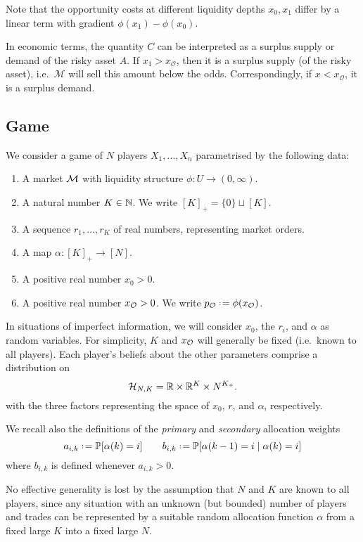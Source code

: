 Note that the opportunity costs at different liquidity depths \(x_0,x_1\) differ by a linear term with gradient \(\phi(x_1)-\phi(x_0)\).


\begin{remark} 
  
  In economic terms, the quantity \(C\) can be interpreted as a surplus supply or demand of the risky asset \(A\). 
  If \(x_1>x_\mathcal{O}\), then it is a surplus supply (of the risky asset), i.e.~\(\mathcal{M}\) will sell this amount below the odds.
  Correspondingly, if \(x<x_\mathcal{O}\), it is a surplus demand.

\end{remark}

\subsection{Game}\label{game}

We consider a game of \(N\) players \(X_1,\ldots,X_n\) parametrised by the following data:
\begin{enumerate}
  \item A market $\mathcal{M}$ with liquidity structure $\phi:U\rightarrow (0,\infty)$.
  \item A natural number $K\in\mathbb N$. We write \([K]_+=\{0\}\sqcup [K]\).
  \item A sequence \(r_1,\ldots,r_K\) of real numbers, representing market orders. 
  \item A map $\alpha:[K]_+\rightarrow[N]$.
  \item A positive real number $x_0>0$.
  \item A positive real number $x_{\mathcal{O}}>0$. We write $p_\oracle\defeq \phi(x_\oracle)$.
\end{enumerate}
In situations of imperfect information, we will consider $x_0$, the $r_i$, and $\alpha$ as random variables.
%
For simplicity, $K$ and $x_{\mathcal{O}}$ will generally be fixed (i.e.~known to all players).
%
Each player's beliefs about the other parameters comprise a distribution on
\[
  \mathcal{H}_{N,K} = \mathbb R\times \mathbb R^K \times N^{K_+}.
\]
with the three factors representing the space of $x_0$, $r$, and $\alpha$, respectively.

We recall also the definitions of the \emph{primary} and \emph{secondary} allocation weights
\[
  a_{i,k}\defeq \Probability[\alpha(k)=i] \qquad b_{i,k}\defeq\Probability[\alpha(k-1)=i\mid \alpha(k)=i]
\]
where $b_{i,k}$ is defined whenever $a_{i,k}>0$.

\begin{remark}
  
  No effective generality is lost by the assumption that \(N\) and \(K\) are known to all players, since any situation with an unknown (but bounded) number of players and trades can be represented by a suitable random allocation function $\alpha$ from a fixed large $K$ into a fixed large $N$.

\end{remark}

